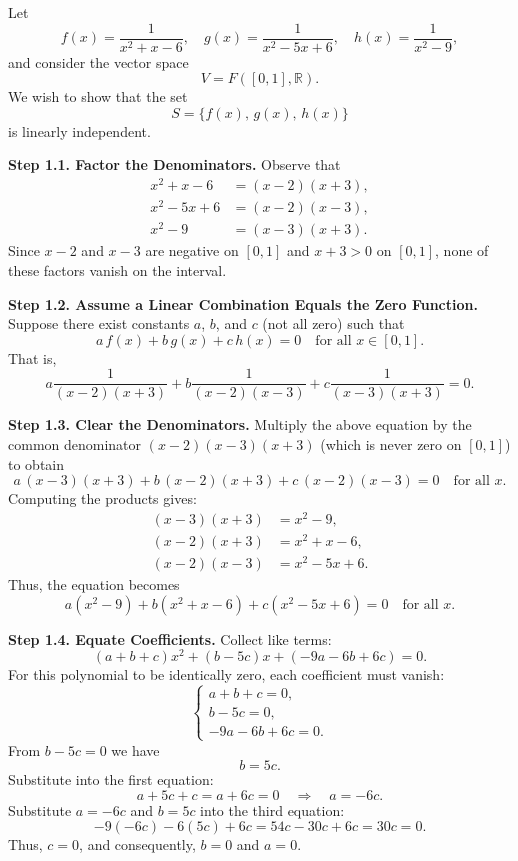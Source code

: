 \documentclass[12pt]{article}
\begin{document}
Let
\[
f(x)=\frac{1}{x^2+x-6},\quad g(x)=\frac{1}{x^2-5x+6},\quad h(x)=\frac{1}{x^2-9},
\]
and consider the vector space 
\[
V=F([0,1],\mathbb{R}).
\]
We wish to show that the set
\[
S=\{f(x),\,g(x),\,h(x)\}
\]
is linearly independent.

\medskip

\textbf{Step 1.1. Factor the Denominators.}  
Observe that
\[
\begin{aligned}
x^2+x-6 &= (x-2)(x+3),\\[1mm]
x^2-5x+6 &= (x-2)(x-3),\\[1mm]
x^2-9 &= (x-3)(x+3).
\end{aligned}
\]
Since \(x-2\) and \(x-3\) are negative on \([0,1]\) and \(x+3>0\) on \([0,1]\), none of these factors vanish on the interval.

\medskip

\textbf{Step 1.2. Assume a Linear Combination Equals the Zero Function.}  
Suppose there exist constants \(a\), \(b\), and \(c\) (not all zero) such that
\[
a\,f(x) + b\,g(x) + c\,h(x) = 0 \quad \text{for all } x\in [0,1].
\]
That is,
\[
a\frac{1}{(x-2)(x+3)} + b\frac{1}{(x-2)(x-3)} + c\frac{1}{(x-3)(x+3)} = 0.
\]

\medskip

\textbf{Step 1.3. Clear the Denominators.}  
Multiply the above equation by the common denominator \((x-2)(x-3)(x+3)\) (which is never zero on \([0,1]\)) to obtain
\[
a\,(x-3)(x+3) + b\,(x-2)(x+3) + c\,(x-2)(x-3) = 0 \quad \text{for all } x.
\]
Computing the products gives:
\[
\begin{aligned}
(x-3)(x+3) &= x^2-9,\\[1mm]
(x-2)(x+3) &= x^2+x-6,\\[1mm]
(x-2)(x-3) &= x^2-5x+6.
\end{aligned}
\]
Thus, the equation becomes
\[
a(x^2-9) + b(x^2+x-6) + c(x^2-5x+6)=0 \quad \text{for all } x.
\]

\medskip

\textbf{Step 1.4. Equate Coefficients.}  
Collect like terms:
\[
(a+b+c)x^2 + (b-5c)x + (-9a-6b+6c)=0.
\]
For this polynomial to be identically zero, each coefficient must vanish:
\[
\begin{cases}
a+b+c=0,\\[1mm]
b-5c=0,\\[1mm]
-9a-6b+6c=0.
\end{cases}
\]
From \(b-5c=0\) we have
\[
b=5c.
\]
Substitute into the first equation:
\[
a+5c+c = a+6c = 0 \quad \Longrightarrow \quad a=-6c.
\]
Substitute \(a=-6c\) and \(b=5c\) into the third equation:
\[
-9(-6c)-6(5c)+6c = 54c - 30c + 6c = 30c = 0.
\]
Thus, \(c=0\), and consequently, \(b=0\) and \(a=0\).  
\end{document}
